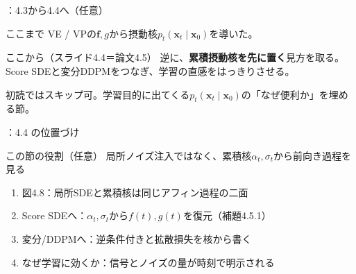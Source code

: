 

\assuppl
\begin{frame}{\supplmark：4.3から4.4へ（任意）}
    \begin{block}{ここまで}
        VE / VPの$\bm{f},g$から摂動核$p_t(\bm{x}_t\mid\bm{x}_0)$を導いた。
    \end{block}
    \begin{block}{ここから（スライド4.4＝論文4.5）}
        逆に、\textbf{累積摂動核を先に置く}見方を取る。\\
        Score SDEと変分DDPMをつなぎ、学習の直感をはっきりさせる。
    \end{block}
    \vfill
    \footnotesize
    初読ではスキップ可。学習目的に出てくる$p_t(\bm{x}_t\mid\bm{x}_0)$の「なぜ便利か」を埋める節。
\end{frame}
\assuppl
\begin{frame}{\supplmark：4.4 の位置づけ}
    \begin{block}{この節の役割（任意）}
        局所ノイズ注入ではなく、累積核$\alpha_t,\sigma_t$から前向き過程を見る
    \end{block}
    \begin{enumerate}
        \item 図4.8：局所SDEと累積核は同じアフィン過程の二面
        \item Score SDEへ：$\alpha_t,\sigma_t$から$f(t),g(t)$を復元（補題4.5.1）
        \item 変分/DDPMへ：逆条件付きと拡散損失を核から書く
        \item なぜ学習に効くか：信号とノイズの量が時刻で明示される
    \end{enumerate}
\end{frame}
